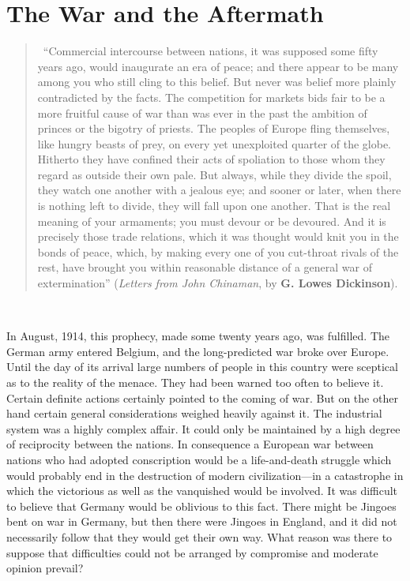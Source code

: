 \documentclass{book}
\begin{document}


\chapter{The War and the Aftermath}
\label{chapter-19}

\begin{quotation}\
	“Commercial intercourse between nations, it was supposed some fifty years ago, would inaugurate an era of peace; and there appear to be many among you who still cling to this belief. But never was belief more plainly contradicted by the facts. The competition for markets bids fair to be a more fruitful cause of war than was ever in the past the ambition of princes or the bigotry of priests. The peoples of Europe fling themselves, like hungry beasts of prey, on every yet unexploited quarter of the globe. Hitherto they have confined their acts of spoliation to those whom they regard as outside their own pale. But always, while they divide the spoil, they watch one another with a jealous eye; and sooner or later, when there is nothing left to divide, they will fall upon one another. That is the real meaning of your armaments; you must devour or be devoured. And it is precisely those trade relations, which it was thought would knit you in the bonds of peace, which, by making every one of you cut-throat rivals of the rest, have brought you within reasonable distance of a general war of extermination” (\emph{Letters from John Chinaman}, by \textbf{G. Lowes Dickinson}).
\end{quotation}\

In August, 1914, this prophecy, made some twenty years ago, was fulfilled. The German army entered Belgium, and the long-predicted war broke over Europe. Until the day of its arrival large numbers of people in this country were sceptical as to the reality of the menace. They had been warned too often to believe it. Certain definite actions certainly pointed to the coming of war. But on the other hand certain general considerations weighed heavily against it. The industrial system was a highly complex affair. It could only be maintained by a high degree of reciprocity between the nations. In consequence a European war between nations who had adopted conscription would be a life-and-death struggle which would probably end in the destruction of modern civilization—in a catastrophe in which the victorious as well as the vanquished would be involved. It was difficult to believe that Germany would be oblivious to this fact. There might be Jingoes bent on war in Germany, but then there were Jingoes in England, and it did not necessarily follow that they would get their own way. What reason was there to suppose that difficulties could not be arranged by compromise and moderate opinion prevail?
\end{document}
